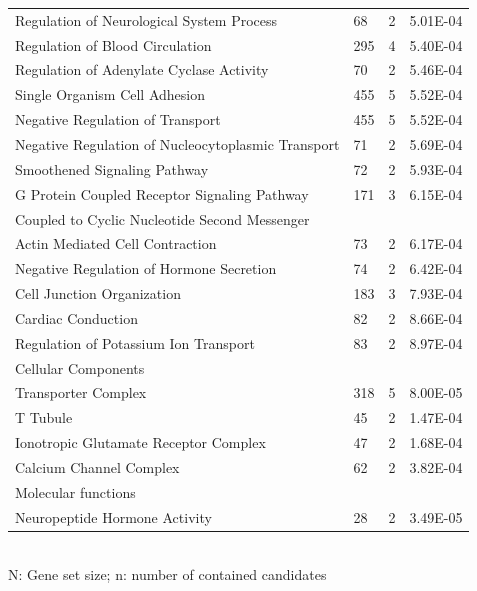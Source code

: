 \begin{refsection}
\begin{table}[H]
\small
{}\selectfont
\label{table3S12v1}
\centering
\begin{tabular}{@{}llll@{}}
\hline
Regulation of Neurological System Process           & 68  & 2 & 5.01E-04         \\
Regulation of Blood Circulation                     & 295 & 4 & 5.40E-04         \\
Regulation of Adenylate Cyclase Activity            & 70  & 2 & 5.46E-04         \\
Single Organism Cell Adhesion                       & 455 & 5 & 5.52E-04         \\
Negative Regulation of Transport                    & 455 & 5 & 5.52E-04         \\
Negative Regulation of Nucleocytoplasmic Transport  & 71  & 2 & 5.69E-04         \\
Smoothened Signaling Pathway                        & 72  & 2 & 5.93E-04         \\
G Protein Coupled Receptor Signaling Pathway        & 171 & 3 & 6.15E-04         \\
Coupled to Cyclic Nucleotide Second Messenger       &     &   &                  \\
Actin Mediated Cell Contraction                     & 73  & 2 & 6.17E-04         \\
Negative Regulation of Hormone Secretion            & 74  & 2 & 6.42E-04         \\
Cell Junction Organization                          & 183 & 3 & 7.93E-04         \\
Cardiac Conduction                                  & 82  & 2 & 8.66E-04         \\
Regulation of Potassium Ion Transport               & 83  & 2 & 8.97E-04         \\
Cellular Components                                 &     &   &                  \\
Transporter Complex                                 & 318 & 5 & 8.00E-05         \\
T Tubule                                            & 45  & 2 & 1.47E-04         \\
Ionotropic Glutamate Receptor Complex               & 47  & 2 & 1.68E-04         \\
Calcium Channel Complex                             & 62  & 2 & 3.82E-04         \\
Molecular functions                                 &     &   &                  \\
Neuropeptide Hormone Activity                       & 28  & 2 & 3.49E-05         \\ \hline
\end{tabular}\\
N: Gene set size; n: number of contained candidates
\end{table}



\end{refsection}
